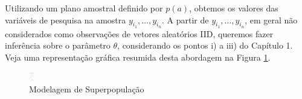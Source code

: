 \documentclass[
  12pt,
  brazilian,
]{book}
\theoremstyle{definition}
\theoremstyle{definition}
\theoremstyle{definition}
\theoremstyle{definition}
\theoremstyle{remark}
\begin{document}
Utilizando um plano amostral definido por \(p(a)\), obtemos os valores das
variáveis de pesquisa na amostra \(y_{i_1}, \ldots , y_{i_n}\). A partir de
\(y_{i_1}, \ldots , y_{i_n}\), em geral não considerados como observações de
vetores aleatórios IID, queremos fazer inferência sobre o parâmetro \(\theta\),
considerando os pontos i) a iii) do Capítulo 1. Veja uma representação gráfica
resumida desta abordagem na Figura \ref{fig:modsup}.

\begin{figure}
\includegraphics[width=10,88in]{Figuras/Figura2.3} \caption{Modelagem de Superpopulação}\label{fig:modsup}
\end{figure}
\end{document}
